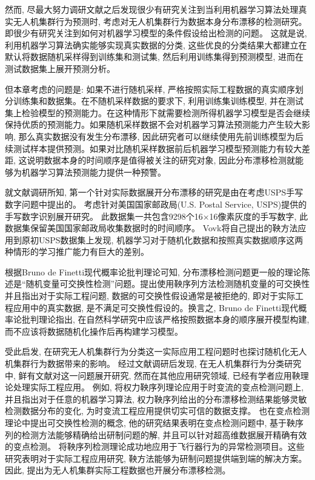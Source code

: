 然而, 尽最大努力调研文献之后发现很少有研究关注到当利用机器学习算法处理真实无人机集群行为预测时, 考虑对无人机集群行为数据本身分布漂移的检测研究。即很少有研究关注到如何对机器学习模型的条件假设给出检测的问题。 这就是说, 利用机器学习算法确实能够实现真实数据的分类, 这些优良的分类结果大都建立在默认将数据随机采样得到训练集和测试集, 然后利用训练集得到预测模型, 进而在测试数据集上展开预测分析。

但本章考虑的问题是: 如果不进行随机采样, 严格按照实际工程数据的真实顺序划分训练集和数据集。在不随机采样数据的要求下, 利用训练集训练模型, 并在测试集上检验模型的预测能力。在这种情形下就需要检测所得机器学习模型是否会继续保持优质的预测能力。如果随机采样数据不会对机器学习算法预测能力产生较大影响, 那么真实数据没有发生分布漂移, 因此研究者可以继续使用先前训练模型为后续测试样本提供预测。如果对比随机采样数据前后机器学习模型预测能力有较大差距, 这说明数据本身的时间顺序是值得被关注的研究对象, 因此分布漂移检测就能够为机器学习算法预测能力提供一种预警。  

就文献调研所知, 第一个针对实际数据展开分布漂移的研究是由\citet{Vovk2003}在考虑USPS手写数字问题中提出的。 \citet{Vovk2003}考虑针对美国国家邮政局(U.S. Postal Service, USPS)提供的手写数字识别展开研究。 此数据集一共包含9298个16$\times$16像素灰度的手写数字, 此数据集保留美国国家邮政局收集数据时的时间顺序\citep{vovk-pvalue2019}。 Vovk将自己提出的鞅方法应用到原初USPS数据集上发现, 机器学习对于随机化数据和按照真实数据顺序这两种情形的学习推广能力有巨大的差别。

根据Bruno de Finetti现代概率论批判理论可知\citep{Finetti1975}, 分布漂移检测问题更一般的理论陈述是“随机变量可交换性检测”问题\citep{Finetti1975}。\citet{Vovk2003}提出使用鞅序列方法检测随机变量的可交换性并且指出对于实际工程问题, 数据的可交换性假设通常是被拒绝的, 即对于实际工程应用中的真实数据, 是不满足可交换性假设的。换言之, Bruno de Finetti现代概率论批判理论指出, 在自然科学研究中应该严格按照数据本身的顺序展开模型构建, 而不应该将数据随机化操作后再构建学习模型。 

受此启发, 在研究无人机集群行为分类这一实际应用工程问题时也探讨随机化无人机集群行为数据带来的影响。 经过文献调研后发现, 在无人机集群行为分类研究中, 鲜有文献对这一问题展开研究, 然而在其他应用研究领域, 已经有学者应用鞅理论处理实际工程应用。 例如, \citet{Ho2005} 将权力鞅序列理论应用于时变流的变点检测问题上, 并且指出对于任意的机器学习算法, 权力鞅序列给出的分布漂移检测结果能够灵敏检测数据分布的变化, 为时变流工程应用提供切实可信的数据支撑。\citet{Ho2012} 也在变点检测理论中提出可交换性检测的概念, 他的研究结果表明在变点检测问题中, 基于鞅序列的检测方法能够精确给出研制问题的解, 并且可以针对超高维数据展开精确有效的变点检测。 \citet{Ho2019}将鞅序列检测理论成功地应用于飞行器行为的异常检测项目。这些研究表明对于实际工程应用研究, 鞅方法能够为研制问题提供端到端的解决方案。因此, 提出为无人机集群实际工程数据也开展分布漂移检测。

